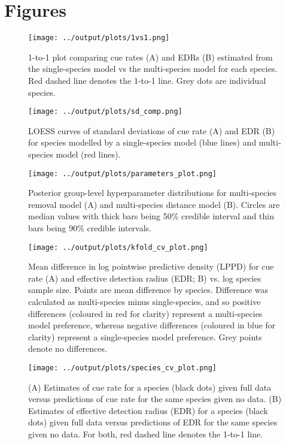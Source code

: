 \documentclass[12pt]{article}
\begin{document}


\section{Figures}

\begin{figure}[h]
	\texttt{[image: ../output/plots/1vs1.png]}
	\caption{1-to-1 plot comparing cue rates (A) and EDRs (B) estimated from the single-species model vs the multi-species model for each species. Red dashed line denotes the 1-to-1 line. Grey dots are individual species.}
	\label{fig:1vs1}
\end{figure}

\begin{figure}[h]
	\texttt{[image: ../output/plots/sd\_comp.png]}
	\caption{LOESS curves of standard deviations of cue rate (A) and EDR (B) for species modelled by a single-species model (blue lines) and multi-species model (red lines).}
	\label{fig:sd}
\end{figure}

\begin{figure}[h]
	\texttt{[image: ../output/plots/parameters\_plot.png]}
	\caption{Posterior group-level hyperparameter distributions for multi-species removal model (A) and multi-species distance model (B). Circles are median values with thick bars being 50\% credible interval and thin bars being 90\% credible intervals.}
	\label{fig:params}
\end{figure}

\begin{figure}[h]
	\texttt{[image: ../output/plots/kfold\_cv\_plot.png]}
	\caption{Mean difference in log pointwise predictive density (LPPD) for cue rate (A) and effective detection radius (EDR; B) vs. log species sample size. Points are mean difference by species. Difference was calculated as multi-species minus single-species, and so positive differences (coloured in red for clarity) represent a multi-species model preference, whereas negative differences (coloured in blue for clarity) represent a single-species model preference. Grey points denote no differences. }
	\label{fig:cv}
\end{figure}

\begin{figure}[h]
	\texttt{[image: ../output/plots/species\_cv\_plot.png]}
	\caption{(A) Estimates of cue rate for a species (black dots) given full data versus predictions of cue rate for the same species given no data. (B) Estimates of effective detection radius (EDR) for a species (black dots) given full data versus predictions of EDR for the same species given no data. For both, red dashed line denotes the 1-to-1 line.}
	\label{fig:species_cv}
\end{figure}
\end{document}

